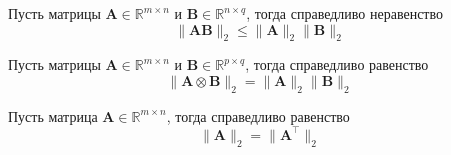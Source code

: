 \begin{property}
\label{prop:matrix_product_norm}
    Пусть матрицы $\mathbf{A} \in \mathbb{R}^{m \times n}$ и $\mathbf{B} \in \mathbb{R}^{n \times q}$, тогда справедливо неравенство
    \begin{equation}
        \| \mathbf{A} \mathbf{B}\|_2 \leq \| \mathbf{A}\|_2 \| \mathbf{B}\|_2
    \end{equation}
\end{property}

\begin{property}\label{prop:kronecker_product_norm}
    Пусть матрицы $\mathbf{A} \in \mathbb{R}^{m \times n}$ и $\mathbf{B} \in \mathbb{R}^{p \times q}$, тогда справедливо равенство
    \begin{equation}
        \| \mathbf{A} \otimes \mathbf{B}\|_2 = \| \mathbf{A}\|_2 \| \mathbf{B}\|_2
    \end{equation}
\end{property}

\begin{property}\label{prop:transposed_matrix_norm}
    Пусть матрица $\mathbf{A} \in \mathbb{R}^{m \times n}$, тогда справедливо равенство
    \begin{equation}
        \| \mathbf{A}\|_2 = \| \mathbf{A}^\top\|_2
    \end{equation}
\end{property}

